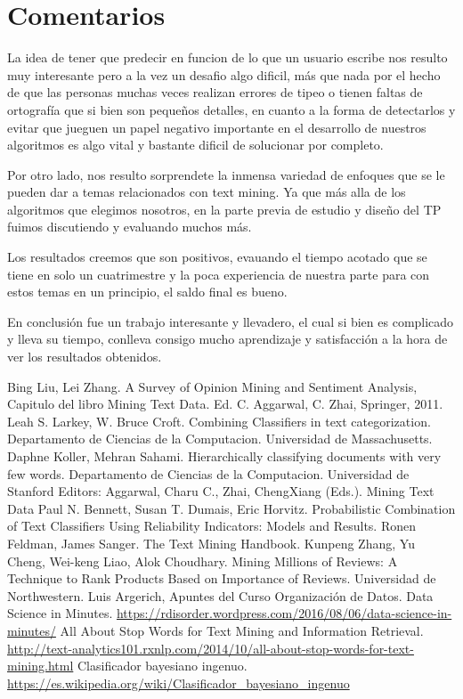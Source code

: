 \documentclass[a4paper,11pt]{report}
\begin{document}
\chapter{Comentarios}

La idea de tener que predecir en funcion de lo que un usuario escribe nos resulto muy interesante pero a la vez un desafio algo dificil, más que nada por el hecho de que las personas muchas veces realizan errores de tipeo o tienen faltas de ortografía que si bien son pequeños detalles, en cuanto a la forma de detectarlos y evitar que jueguen un papel negativo importante en el desarrollo de nuestros algoritmos es algo vital y bastante dificil de solucionar por completo. 

Por otro lado, nos resulto sorprendete la inmensa variedad de enfoques que se le pueden dar a temas relacionados con text mining. Ya que más alla de los algoritmos que elegimos nosotros, en la parte previa de estudio y diseño del TP fuimos discutiendo y evaluando muchos más.

Los resultados creemos que son positivos, evauando el tiempo acotado que se tiene en solo un cuatrimestre y la poca experiencia de nuestra parte para con estos temas en un principio, el saldo final es bueno.

En conclusión fue un trabajo interesante y llevadero, el cual si bien es complicado y lleva su tiempo, conlleva consigo mucho aprendizaje y satisfacción a la hora de ver los resultados obtenidos.  

\begin{thebibliography}{99}
 Bing Liu, Lei Zhang. A Survey of Opinion Mining and Sentiment Analysis, Capitulo del libro Mining Text Data. Ed. C. Aggarwal, C. Zhai, Springer, 2011.
 Leah S. Larkey, W. Bruce Croft. Combining Classifiers in text categorization. Departamento de Ciencias de la Computacion. Universidad de Massachusetts.
 Daphne Koller, Mehran Sahami. Hierarchically classifying documents with very few words. Departamento de Ciencias de la Computacion. Universidad de Stanford
 Editors: Aggarwal, Charu C., Zhai, ChengXiang (Eds.). Mining Text Data
 Paul N. Bennett, Susan T. Dumais, Eric Horvitz. Probabilistic Combination of Text Classifiers Using Reliability Indicators: Models and Results.
Ronen Feldman, James Sanger. The Text Mining Handbook.
 Kunpeng Zhang, Yu Cheng, Wei-keng Liao, Alok Choudhary. Mining Millions of Reviews: A Technique to Rank Products Based on Importance of Reviews. Universidad de Northwestern.
 Luis Argerich, Apuntes del Curso Organización de Datos.
 Data Science in Minutes. 
\url{ https://rdisorder.wordpress.com/2016/08/06/data-science-in-minutes/}
 All About Stop Words for Text Mining and Information Retrieval. 
\url{http://text-analytics101.rxnlp.com/2014/10/all-about-stop-words-for-text-mining.html}
 Clasificador bayesiano ingenuo. 
\url{https://es.wikipedia.org/wiki/Clasificador_bayesiano_ingenuo}
\end{thebibliography}
\end{document}
